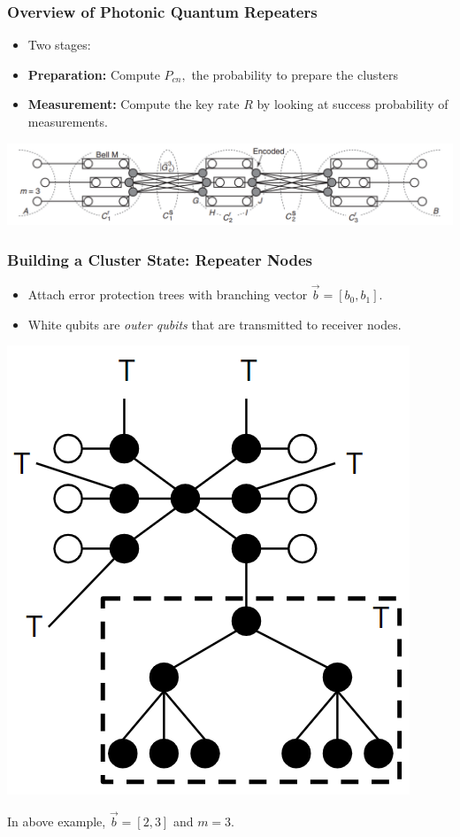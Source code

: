 \documentclass[aspectratio=169,xcolor=dvipsnames]{beamer}
\begin{document}
\begin{frame}
    \frametitle{Overview of Photonic Quantum Repeaters}
    \begin{itemize}
        \item Two stages:
        \begin{center}
    \end{center}
    \item \textbf{Preparation:} Compute $P_{cn},$ the probability to prepare the clusters
    \item \textbf{Measurement:} Compute the key rate $R$ by looking at success probability of measurements.
\end{itemize}
\begin{center}
    \includegraphics[width=\linewidth]{figs/photonics.png}
\end{center}
\end{frame}
\begin{frame}
    \frametitle{Building a Cluster State: Repeater Nodes}
    \begin{itemize}
        \item Attach error protection trees with branching vector $\vec{b}=[b_0, b_1].$ 
        \item White qubits are \textit{outer qubits} that are transmitted to receiver nodes.
    \end{itemize}
    \begin{center}
        \includegraphics[width=0.3\linewidth]{figs/cluster.png}
    \end{center}
    In above example, $\vec{b}=[2,3]$ and $m=3.$
\end{frame}
\end{document}
